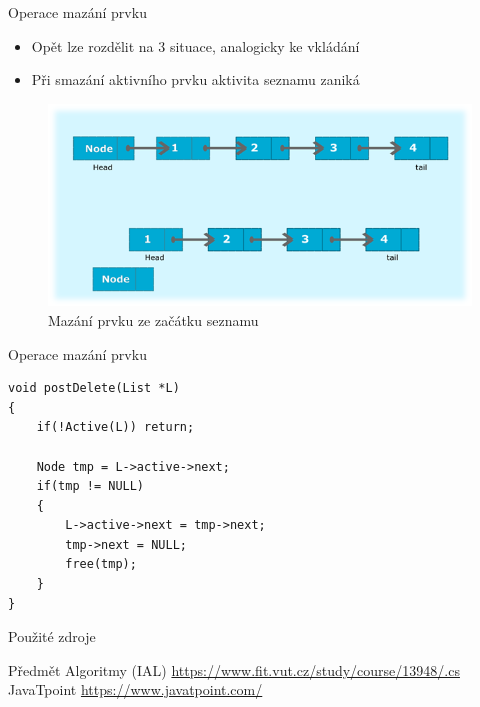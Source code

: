 \documentclass[10pt, hyperref={unicode}]{beamer}
\begin{document}
\begin{frame}{Operace mazání prvku}
\begin{itemize}
    \item Opět lze rozdělit na 3 situace, analogicky ke vkládání
    \item Při smazání aktivního prvku aktivita seznamu zaniká
\end{itemize}
\begin{figure}[h]
    \centering
    \includegraphics[scale=0.52]{delete.png}
    \caption{Mazání prvku ze začátku seznamu}
\end{figure}
\end{frame}


\begin{frame}[fragile]{Operace mazání prvku}
\begin{lstlisting}[title=Mazání prvku za aktivním prvkem seznamu v~jazyce C:]
void postDelete(List *L)
{
    if(!Active(L)) return;
    
 	Node tmp = L->active->next;
	if(tmp != NULL)
	{
		L->active->next = tmp->next;
		tmp->next = NULL;
		free(tmp);
	}
}
\end{lstlisting}
\end{frame}


\begin{frame}{Použité zdroje}
\begin{thebibliography}{}
\bibitem{} Předmět Algoritmy (IAL)
    \newblock \url{https://www.fit.vut.cz/study/course/13948/.cs}
\bibitem{} JavaTpoint
    \newblock \url{https://www.javatpoint.com/}
\end{thebibliography}
\end{frame}
\end{document}
